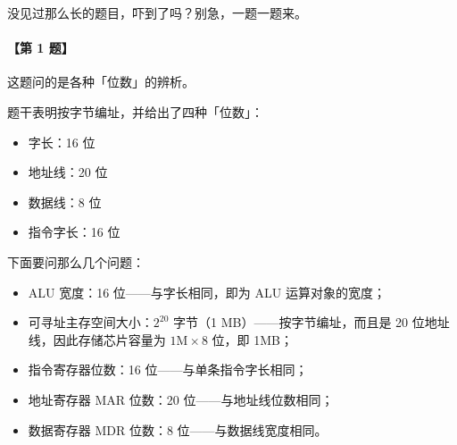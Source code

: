 \documentclass[UTF8]{ctexart}
\begin{document}
\newpage
{}
\BgThispage
没见过那么长的题目，吓到了吗？别急，一题一题来。

\paragraph{【第 1 题】} 这题问的是各种「位数」的辨析。

题干表明按字节编址，并给出了四种「位数」：
\begin{itemize}[itemsep=0pt,parsep=0pt]
  \item 字长：16 位
  \item 地址线：20 位
  \item 数据线：8 位
  \item 指令字长：16 位
\end{itemize}
下面要问那么几个问题：
\begin{itemize}[itemsep=0pt,parsep=0pt]
  \item ALU 宽度：16 位——与字长相同，即为 ALU 运算对象的宽度；
  \item 可寻址主存空间大小：$2^{20}$ 字节（1 MB）——按字节编址，而且是 20 位地址线，因此存储芯片容量为 $1\mathrm{M}\times 8$ 位，即 1MB；
  \item 指令寄存器位数：16 位——与单条指令字长相同；
  \item 地址寄存器 MAR 位数：20 位——与地址线位数相同；
  \item 数据寄存器 MDR 位数：8 位——与数据线宽度相同。
\end{itemize}
\end{document}
